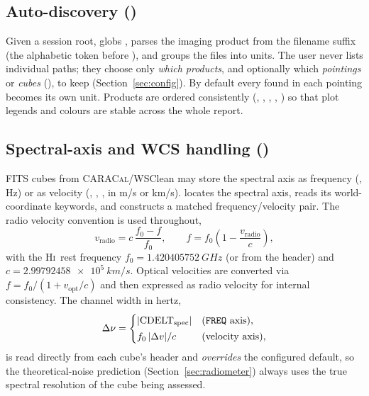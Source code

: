 \documentclass[11pt,a4paper]{article}
\begin{document}
\subsection{Auto-discovery ()}
Given a session root,  globs
, parses the imaging product from the
filename suffix (the alphabetic token before ), and groups the files
into units. The user never lists individual paths; they choose only \emph{which
products}, and optionally which \emph{pointings} or \emph{cubes}
(), to keep (Section~\ref{sec:config}). By default every
 found in each pointing becomes its own unit. Products are ordered
consistently
(, , , , ) so that
plot legends and colours are stable across the whole report.

\subsection{Spectral-axis and WCS handling ()}
FITS cubes from \textsc{CARACal}/WSClean \citep{offringa2014} may store the
spectral axis as frequency (, Hz) or as velocity (,
, , in \si{m/s} or \si{km/s}).  locates
the spectral axis, reads its world-coordinate keywords, and constructs a matched
frequency/velocity pair. The radio velocity convention is used throughout,
\begin{equation}
  v_{\mathrm{radio}} = c\,\frac{f_0 - f}{f_0},
  \qquad
  f = f_0\!\left(1 - \frac{v_{\mathrm{radio}}}{c}\right),
  \label{eq:radio}
\end{equation}
with the \textsc{Hi}\ rest frequency $f_0 = \SI{1.420405752}{GHz}$ (or
 from the header) and $c = \SI{2.99792458e5}{km/s}$. Optical
velocities are converted via $f = f_0/(1+v_{\mathrm{opt}}/c)$ and then expressed
as radio velocity for internal consistency. The channel width in hertz,
\begin{equation}
  \Delta\nu =
  \begin{cases}
    |\mathrm{CDELT}_{\mathrm{spec}}| & \text{(\texttt{FREQ} axis),}\\[2pt]
    f_0\,|\Delta v|/c & \text{(velocity axis),}
  \end{cases}
\end{equation}
is read directly from each cube's header and \emph{overrides} the configured
default, so the theoretical-noise prediction (Section~\ref{sec:radiometer})
always uses the true spectral resolution of the cube being assessed.
\end{document}
